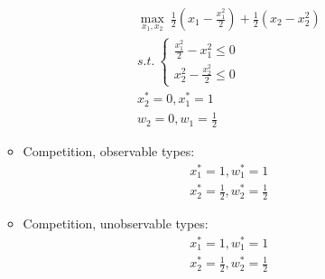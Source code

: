 \documentclass[a4paper]{article}
\begin{document}
\begin{enumerate}
\begin{itemize}
\begin{align*}
		\underset{x_1, x_2}{\max}\ \frac{1}{2}\left(x_1 -\frac{x_1^2}{2}\right) + \frac{1}{2} \left(x_2 - x_2^2\right)\\
		s.t.\ 	\begin{cases}
		\frac{x_1^2}{2} - x_1^2 \le 0\\
		x_2^2 - \frac{x_2^2}{2} \le 0
		\end{cases}\\
		x_2^* = 0, x_1^* = 1\\
		w_2 = 0, w_1 = \frac{1}{2}
		\end{align*}
		\item Competition, observable types:
		\begin{align*}
		x_1^* = 1, w_1^* = 1\\
		x_2^* = \frac{1}{2}, w_2^* = \frac{1}{2}
		\end{align*}
		\item Competition, unobservable types:
		\begin{align*}
		x_1^* = 1, w_1^* = 1\\
		x_2^* = \frac{1}{2}, w_2^* = \frac{1}{2}
		\end{align*}
	\end{itemize}
\end{enumerate}
\end{document}
